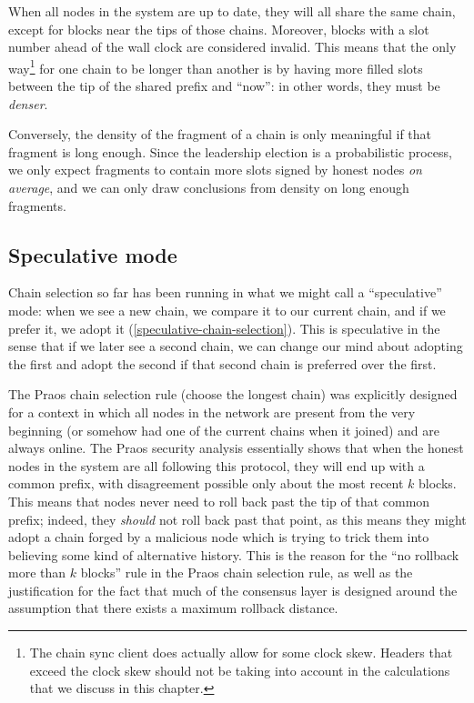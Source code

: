 When all nodes in the system are up to date, they will all share the same chain,
except for blocks near the tips of those chains. Moreover, blocks with a slot
number ahead of the wall clock are considered invalid. This means that the only
way\footnote{The chain sync client does actually allow for some clock skew.
Headers that exceed the clock skew should not be taking into account in the
calculations that we discuss in this chapter.} for one chain to be longer than
another is by having more filled slots between the tip of the shared prefix and
``now'': in other words, they must be \emph{denser}.
%
\begin{center}
\end{center}
%
Conversely, the density of the fragment of a chain is only meaningful if that
fragment is long enough. Since the leadership election is a probabilistic
process, we only expect fragments to contain more slots signed by honest nodes
\emph{on average}, and we can only draw conclusions from density on long enough
fragments.

\subsection{Speculative mode}

Chain selection so far has been running in what we might call a ``speculative''
mode: when we see a new chain, we compare it to our current chain, and if we
prefer it, we adopt it (\cref{speculative-chain-selection}). This is speculative
in the sense that if we later see a second chain, we can change our mind about
adopting the first and adopt the second if that second chain is preferred over
the first.

The Praos chain selection rule (choose the longest chain) was explicitly
designed for a context in which all nodes in the network are present from the
very beginning (or somehow had one of the current chains when it joined) and are
always online. The Praos security analysis \cite{cryptoeprint:2017:573}
essentially shows that when the honest nodes in the system are all following
this protocol, they will end up with a common prefix, with disagreement possible
only about the most recent $k$ blocks. This means that nodes never need to roll
back past the tip of that common prefix; indeed, they \emph{should} not roll
back past that point, as this means they might adopt a chain forged by a
malicious node which is trying to trick them into believing some kind of
alternative history. This is the reason for the ``no rollback more than $k$
blocks'' rule in the Praos chain selection rule, as well as the justification
for the fact that much of the consensus layer is designed around the assumption
that there exists a maximum rollback distance.

